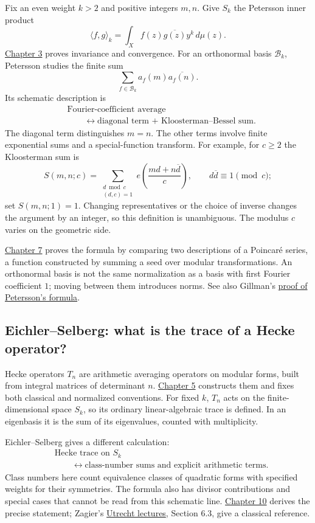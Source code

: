 Fix an even weight \(k>2\) and positive integers \(m,n\). Give \(S_k\) the Petersson inner product
\[
\langle f,g\rangle_k=\int_X f(z)\overline{g(z)}y^k\,d\mu(z).
\]
\hyperref[v1a-ch03]{Chapter 3} proves invariance and convergence. For an orthonormal basis \(\mathcal B_k\), Petersson studies the finite sum
\[
\sum_{f\in\mathcal B_k}a_f(m)\overline{a_f(n)}.
\]
Its schematic description is
\[
\begin{aligned}
&\text{Fourier-coefficient average}\\
&\qquad\longleftrightarrow
\text{diagonal term + Kloosterman--Bessel sum}.
\end{aligned}
\]
The diagonal term distinguishes \(m=n\). The other terms involve finite exponential sums and a special-function transform. For example, for \(c\geq2\) the Kloosterman sum is
\[
S(m,n;c)=\sum_{\substack{d\bmod c\\(d,c)=1}}
e\left(\frac{md+n\overline d}{c}\right),
\qquad d\overline d\equiv1\pmod c;
\]
set \(S(m,n;1)=1\). Changing representatives or the choice of inverse changes the argument by an integer, so this definition is unambiguous. The modulus \(c\) varies on the geometric side.

\hyperref[v1a-ch07]{Chapter 7} proves the formula by comparing two descriptions of a Poincar\'e series, a function constructed by summing a seed over modular transformations. An orthonormal basis is not the same normalization as a basis with first Fourier coefficient \(1\); moving between them introduces norms. See also Gillman's \href{https://cs.brown.edu/people/ngillman/expository/petersson.pdf}{proof of Petersson's formula}.

\subsection{Eichler--Selberg: what is the trace of a Hecke operator?}\label{eichler-selberg-preview}

Hecke operators \(T_n\) are arithmetic averaging operators on modular forms, built from integral matrices of determinant \(n\). \hyperref[v1a-ch05]{Chapter 5} constructs them and fixes both classical and normalized conventions. For fixed \(k\), \(T_n\) acts on the finite-dimensional space \(S_k\), so its ordinary linear-algebraic trace is defined. In an eigenbasis it is the sum of its eigenvalues, counted with multiplicity.

Eichler--Selberg gives a different calculation:
\[
\begin{aligned}
&\text{Hecke trace on }S_k\\
&\qquad\longleftrightarrow
\text{class-number sums and explicit arithmetic terms}.
\end{aligned}
\]
Class numbers here count equivalence classes of quadratic forms with specified weights for their symmetries. The formula also has divisor contributions and special cases that cannot be read from this schematic line. \hyperref[v1a-ch10]{Chapter 10} derives the precise statement; Zagier's \href{https://people.mpim-bonn.mpg.de/zagier/files/tex/UtrechtLectures/UtBook.pdf}{Utrecht lectures}, Section 6.3, give a classical reference.

